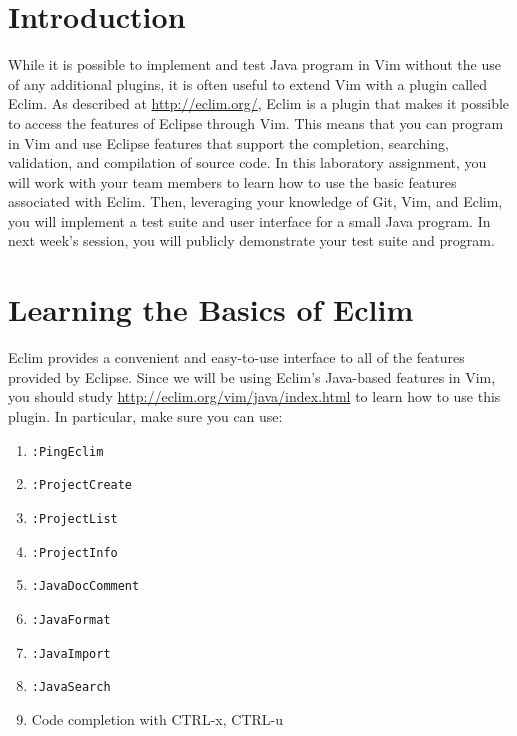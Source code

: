 

\usepackage[compact]{titlesec}



\section*{Introduction}

While it is possible to implement and test Java program in Vim without the use of any additional plugins, it is often
useful to extend Vim with a plugin called Eclim.  As described at \url{http://eclim.org/}, Eclim is a plugin that makes
it possible to access the features of Eclipse through Vim.  This means that you can program in Vim and use Eclipse
features that support the completion, searching, validation, and compilation of source code. In this laboratory
assignment, you will work with your team members to learn how to use the basic features associated with Eclim.  Then,
leveraging your knowledge of Git, Vim, and Eclim, you will implement a test suite and user interface for a small Java
program.  In next week's session, you will publicly demonstrate your test suite and program.

\section*{Learning the Basics of Eclim}

Eclim provides a convenient and easy-to-use interface to all of the features provided by Eclipse.  Since we will be
using Eclim's Java-based features in Vim, you should study \url{http://eclim.org/vim/java/index.html} to learn how to
use this plugin.  In particular, make sure you can use:

\begin{enumerate}
	\item {\tt :PingEclim}
	\item {\tt :ProjectCreate}
	\item {\tt :ProjectList}
	\item {\tt :ProjectInfo}
	\item {\tt :JavaDocComment}
	\item {\tt :JavaFormat}
	\item {\tt :JavaImport}
	\item {\tt :JavaSearch}
	\item Code completion with CTRL-x, CTRL-u 
\end{enumerate}

